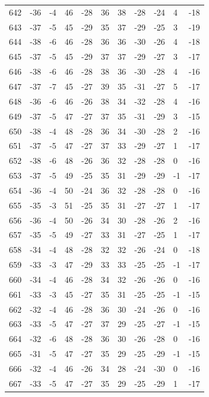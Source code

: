 \begin{table}[H]
\begin{tabular}{lllllllllll}
642 & -36 & -4 & 46 & -28 & 36 & 38 & -28 & -24 & 4 & -18 \\
643 & -37 & -5 & 45 & -29 & 35 & 37 & -29 & -25 & 3 & -19 \\
644 & -38 & -6 & 46 & -28 & 36 & 36 & -30 & -26 & 4 & -18 \\
645 & -37 & -5 & 45 & -29 & 37 & 37 & -29 & -27 & 3 & -17 \\
646 & -38 & -6 & 46 & -28 & 38 & 36 & -30 & -28 & 4 & -16 \\
647 & -37 & -7 & 45 & -27 & 39 & 35 & -31 & -27 & 5 & -17 \\
648 & -36 & -6 & 46 & -26 & 38 & 34 & -32 & -28 & 4 & -16 \\
649 & -37 & -5 & 47 & -27 & 37 & 35 & -31 & -29 & 3 & -15 \\
650 & -38 & -4 & 48 & -28 & 36 & 34 & -30 & -28 & 2 & -16 \\
651 & -37 & -5 & 47 & -27 & 37 & 33 & -29 & -27 & 1 & -17 \\
652 & -38 & -6 & 48 & -26 & 36 & 32 & -28 & -28 & 0 & -16 \\
653 & -37 & -5 & 49 & -25 & 35 & 31 & -29 & -29 & -1 & -17 \\
654 & -36 & -4 & 50 & -24 & 36 & 32 & -28 & -28 & 0 & -16 \\
655 & -35 & -3 & 51 & -25 & 35 & 31 & -27 & -27 & 1 & -17 \\
656 & -36 & -4 & 50 & -26 & 34 & 30 & -28 & -26 & 2 & -16 \\
657 & -35 & -5 & 49 & -27 & 33 & 31 & -27 & -25 & 1 & -17 \\
658 & -34 & -4 & 48 & -28 & 32 & 32 & -26 & -24 & 0 & -18 \\
659 & -33 & -3 & 47 & -29 & 33 & 33 & -25 & -25 & -1 & -17 \\
660 & -34 & -4 & 46 & -28 & 34 & 32 & -26 & -26 & 0 & -16 \\
661 & -33 & -3 & 45 & -27 & 35 & 31 & -25 & -25 & -1 & -15 \\
662 & -32 & -4 & 46 & -28 & 36 & 30 & -24 & -26 & 0 & -16 \\
663 & -33 & -5 & 47 & -27 & 37 & 29 & -25 & -27 & -1 & -15 \\
664 & -32 & -6 & 48 & -28 & 36 & 30 & -26 & -28 & 0 & -16 \\
665 & -31 & -5 & 47 & -27 & 35 & 29 & -25 & -29 & -1 & -15 \\
666 & -32 & -4 & 46 & -26 & 34 & 28 & -24 & -30 & 0 & -16 \\
667 & -33 & -5 & 47 & -27 & 35 & 29 & -25 & -29 & 1 & -17 \\

\end{tabular}
\end{table}
